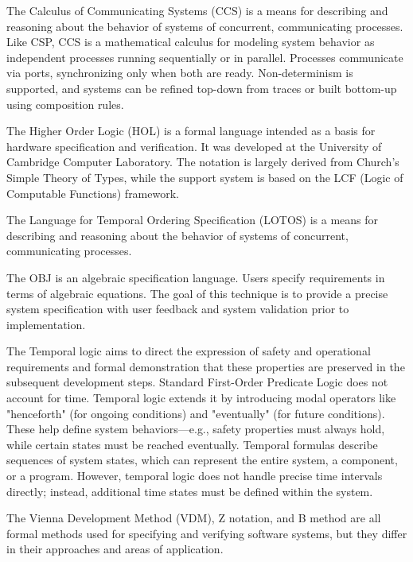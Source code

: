 The {\sbf Calculus of Communicating Systems (CCS)} is a means for describing and reasoning about the behavior of systems of concurrent, communicating processes. Like CSP, CCS is a mathematical calculus for modeling system behavior as independent processes running sequentially or in parallel. Processes communicate via ports, synchronizing only when both are ready. Non-determinism is supported, and systems can be refined top-down from traces or built bottom-up using composition rules.

The {\sbf Higher Order Logic (HOL)} is a formal language intended as a basis for hardware specification and verification. It was developed at the University of Cambridge Computer Laboratory. The notation is largely derived from Church's Simple Theory of Types, while the support system is based on the LCF (Logic of Computable Functions) framework.

The {\sbf Language for Temporal Ordering Specification (LOTOS)} is a means for describing and reasoning about the behavior of systems of concurrent, communicating processes.

The {\sbf OBJ} is an algebraic specification language. Users specify requirements in terms of algebraic equations. The goal of this technique is to provide a precise system specification with user feedback and system validation prior to implementation.

The {\sbf Temporal logic} aims to direct the expression of safety and operational requirements and formal demonstration that these properties are preserved in the subsequent development steps. Standard First-Order Predicate Logic does not account for time. Temporal logic extends it by introducing modal operators like "henceforth" (for ongoing conditions) and "eventually" (for future conditions). These help define system behaviors—e.g., safety properties must always hold, while certain states must be reached eventually. Temporal formulas describe sequences of system states, which can represent the entire system, a component, or a program. However, temporal logic does not handle precise time intervals directly; instead, additional time states must be defined within the system.

The {\sbf Vienna Development Method (VDM)}, {\sbf Z notation}, and {\sbf B method} are all formal methods used for specifying and verifying software systems, but they differ in their approaches and areas of application.

